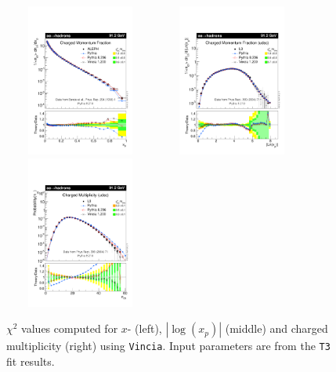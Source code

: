 \documentclass[aps,preprint,floatfix,nofootinbib,showpacs]{revtex4-1}
\begin{document}
   \begin{figure}[!h]
 \centering
 \includegraphics[width=5cm, height=5cm]{Vincia-T4/vincia03-x.pdf}
 \hfill
 \includegraphics[width=5cm, height=5cm]{Vincia-T4/vincia03-Lnx.pdf}
 \hfill
 \includegraphics[width=5cm, height=5cm]{Vincia-T4/vincia03-Nch.pdf}
 \caption{$\chi^2$ values computed for $x$- (left), $|\log(x_p)|$ (middle) and charged multiplicity (right) using
 \texttt{Vincia}. Input parameters are from the \texttt{T3} fit results.}
 \label{Chi2-4}
 \end{figure}
 
\end{document}

